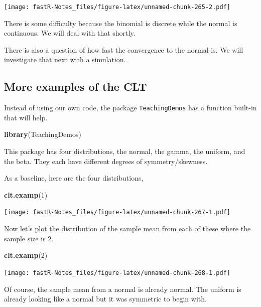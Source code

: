 \documentclass[]{book}
\newenvironment{Shaded}{\begin{snugshade}}{\end{snugshade}}
\newcommand{\KeywordTok}[1]{\textcolor[rgb]{0.13,0.29,0.53}{\textbf{#1}}}
\newcommand{\DecValTok}[1]{\textcolor[rgb]{0.00,0.00,0.81}{#1}}
\newcommand{\NormalTok}[1]{#1}
\theoremstyle{definition}
\theoremstyle{definition}
\theoremstyle{definition}
\theoremstyle{remark}
\begin{document}
\texttt{[image: fastR-Notes\_files/figure-latex/unnamed-chunk-265-2.pdf]}

There is some difficulty because the binomial is discrete while the
normal is continuous. We will deal with that shortly.

There is also a question of how fast the convergence to the normal is.
We will investigate that next with a simulation.

\subsection{More examples of the CLT}\label{more-examples-of-the-clt}

Instead of using our own code, the package \texttt{TeachingDemos} has a
function built-in that will help.

\begin{Shaded}
\begin{Highlighting}[]
\KeywordTok{library}\NormalTok{(TeachingDemos)}
\end{Highlighting}
\end{Shaded}

This package has four distributions, the normal, the gamma, the uniform,
and the beta. They each have different degrees of symmetry/skewness.

As a baseline, here are the four distributions,

\begin{Shaded}
\begin{Highlighting}[]
\KeywordTok{clt.examp}\NormalTok{(}\DecValTok{1}\NormalTok{)}
\end{Highlighting}
\end{Shaded}

\texttt{[image: fastR-Notes\_files/figure-latex/unnamed-chunk-267-1.pdf]}

Now let's plot the distribution of the sample mean from each of these
where the sample size is 2.

\begin{Shaded}
\begin{Highlighting}[]
\KeywordTok{clt.examp}\NormalTok{(}\DecValTok{2}\NormalTok{)}
\end{Highlighting}
\end{Shaded}

\texttt{[image: fastR-Notes\_files/figure-latex/unnamed-chunk-268-1.pdf]}

Of course, the sample mean from a normal is already normal. The uniform
is already looking like a normal but it was symmetric to begin with.
\end{document}
